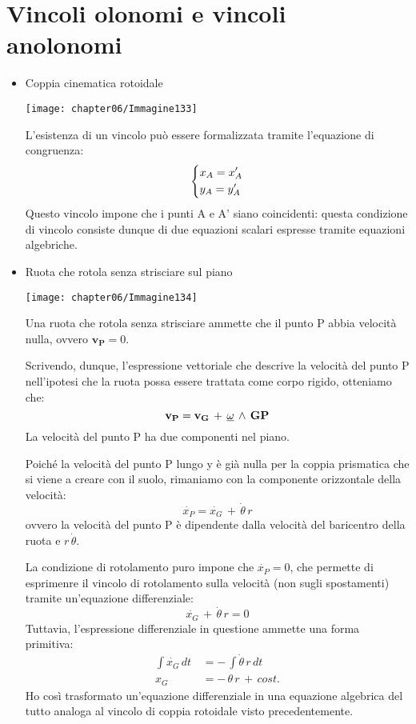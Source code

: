 \section{Vincoli olonomi e vincoli anolonomi}
\begin{itemize}
\item Coppia cinematica rotoidale

\begin{minipage}{.4\textwidth}
\centering
\texttt{[image: chapter06/Immagine133]}
\end{minipage}
\hfill
\begin{minipage}{.5\textwidth}
L'esistenza di un vincolo può essere formalizzata tramite l'equazione di congruenza:
\[
\begin{dcases}
x_A = x_A'\\
y_A = y_A'
\end{dcases}
\]
Questo vincolo impone che i punti A e A' siano coincidenti: questa condizione di vincolo consiste dunque di due equazioni scalari espresse tramite equazioni algebriche.
\end{minipage}

\item Ruota che rotola senza strisciare sul piano

\begin{minipage}{.4\textwidth}
\centering
\texttt{[image: chapter06/Immagine134]}
\end{minipage}
\hfill
\begin{minipage}{.5\textwidth}
Una ruota che rotola senza strisciare ammette che il punto P abbia velocità nulla, ovvero $\mathbf{v_P} = 0$.

Scrivendo, dunque, l'espressione vettoriale che descrive la velocità del punto P nell'ipotesi che la ruota possa essere trattata come corpo rigido, otteniamo che:
\[\mathbf{v_P} = \mathbf{v_G}\,+\,\underline{\omega}\,\wedge\,\mathbf{GP}\]
La velocità del punto P ha due componenti nel piano. 
\end{minipage}

Poiché la velocità del punto P lungo y è già nulla per la coppia prismatica che si viene a creare con il suolo, rimaniamo con la componente orizzontale della velocità:
\[\dot{x_P} = \dot{x_G}\,+\,\dot{\theta}\,r\]
ovvero la velocità del punto P è dipendente dalla velocità del baricentro della ruota e $r\,\dot{\theta}$.

La condizione di rotolamento puro impone che $\dot{x_P} = 0$, che permette di esprimenre il vincolo di rotolamento sulla velocità (non sugli spostamenti) tramite un'equazione differenziale:
\[\dot{x_G}\,+\,\dot{\theta}\,r = 0\]
Tuttavia, l'espressione differenziale in questione ammette una forma primitiva:
\begin{align*}
\int{\dot{x_G}\,dt}\,&=-\,\int{\dot{\theta}\,r\,dt}\\
x_G &= -\,\theta\,r\,+\,cost.
\end{align*}
Ho così trasformato un'equazione differenziale in una equazione algebrica del tutto analoga al vincolo di coppia rotoidale visto precedentemente.


\end{itemize}
